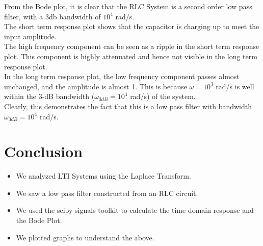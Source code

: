 \documentclass[12pt, a4paper]{article}
\begin{document}
From the Bode plot, it is clear that the RLC System is a second order low pass filter,
with a 3db bandwidth of $10^4$ rad/s. \\
The short term response plot shows that the capacitor is charging up to meet the input amplitude. \\
The high frequency component can be seen as a ripple in the short term response plot.
This component is highly attenuated and hence not visible in the long term response plot. \\
In the long term response plot, the low frequency component passes almost unchanged,
and the amplitude is almost 1. This is because $\omega = 10^3$ rad/s is well within the 3-dB bandwidth
($\omega_{3dB} = 10^4$ rad/s) of the system. \\
Clearly, this demonstrates the fact that this is a low pass filter with bandwidth
$\omega_{3dB} = 10^4$ rad/s.



\section{Conclusion}
\begin{itemize}
    \item We analyzed LTI Systems using the Laplace Transform.
    \item We saw a low pass filter constructed from an RLC circuit.
    \item We used the scipy signals toolkit to calculate the time domain response and the Bode Plot.
    \item We plotted graphs to understand the above.
\end{itemize}
\end{document}
